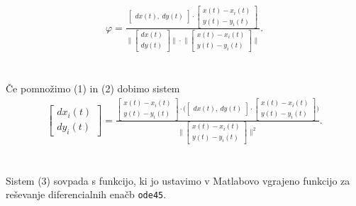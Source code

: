 \documentclass[a4paper,12pt]{article}
\begin{document}
\begin{align}
    \varphi = 
    \frac{
    \begin{bmatrix} 
        dx(t), \ %
        dy(t)
    \end{bmatrix}
    \cdot
    \begin{bmatrix} 
        x(t) - x_i(t) \\
        y(t) - y_i(t)
    \end{bmatrix}
    }
    {
    \Big \|
    \begin{bmatrix} 
        dx(t) \\
        dy(t)
    \end{bmatrix}
    \Big \| 
    \cdot
    \Big \|
    \begin{bmatrix} 
        x(t) - x_i(t) \\
        y(t) - y_i(t)
    \end{bmatrix}
    \Big \| 
    }
    .
\end{align}
\\
\\
Če pomnožimo (1) in (2) dobimo sistem \\
\begin{align}
    \begin{bmatrix} 
        dx_i(t) \\
        dy_i(t) 
    \end{bmatrix}
    =
    \frac{
    \begin{bmatrix} 
        x(t) - x_i(t) \\
        y(t) - y_i(t)
    \end{bmatrix}
    \cdot
    \Big(
    \begin{bmatrix} 
        dx(t), \ %
        dy(t)
    \end{bmatrix}
    \cdot
    \begin{bmatrix} 
        x(t) - x_i(t) \\
        y(t) - y_i(t)
    \end{bmatrix}
    \Big)
    }
    {
    \Big \|
    \begin{bmatrix} 
        x(t) - x_i(t) \\
        y(t) - y_i(t)
    \end{bmatrix}
    \Big \| ^ {2}
    }
    .
\end{align}
\\
\\
Sistem (3) sovpada s funkcijo, ki jo ustavimo v Matlabovo vgrajeno funkcijo za reševanje diferencialnih enačb 
{\texttt{ode45}}.
\\
\\
\end{document}
